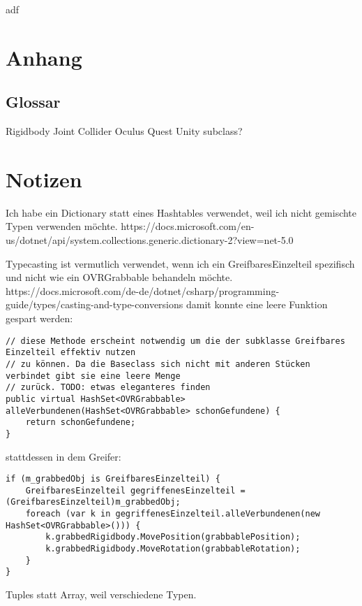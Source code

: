 \documentclass[11pt]{article} %
\begin{document}
adf




\section {Anhang}

\subsection{Glossar}

Rigidbody
Joint
Collider
Oculus
Quest
Unity
subclass?

\section{Notizen}

Ich habe ein Dictionary statt eines Hashtables verwendet, weil ich nicht gemischte Typen verwenden möchte. 
https://docs.microsoft.com/en-us/dotnet/api/system.collections.generic.dictionary-2?view=net-5.0


Typecasting ist vermutlich verwendet, wenn ich ein GreifbaresEinzelteil spezifisch und nicht wie ein OVRGrabbable behandeln möchte. 
https://docs.microsoft.com/de-de/dotnet/csharp/programming-guide/types/casting-and-type-conversions
damit konnte eine leere Funktion gespart werden:

\begin{lstlisting}
// diese Methode erscheint notwendig um die der subklasse Greifbares Einzelteil effektiv nutzen 
// zu können. Da die Baseclass sich nicht mit anderen Stücken verbindet gibt sie eine leere Menge
// zurück. TODO: etwas eleganteres finden
public virtual HashSet<OVRGrabbable> alleVerbundenen(HashSet<OVRGrabbable> schonGefundene) {
	return schonGefundene;
}
\end{lstlisting}

stattdessen in dem Greifer: 

\begin{lstlisting}
if (m_grabbedObj is GreifbaresEinzelteil) {
	GreifbaresEinzelteil gegriffenesEinzelteil = (GreifbaresEinzelteil)m_grabbedObj;
	foreach (var k in gegriffenesEinzelteil.alleVerbundenen(new HashSet<OVRGrabbable>())) {
		k.grabbedRigidbody.MovePosition(grabbablePosition);
		k.grabbedRigidbody.MoveRotation(grabbableRotation);
	}
}
\end{lstlisting}

Tuples statt Array, weil verschiedene Typen.
\end{document}
